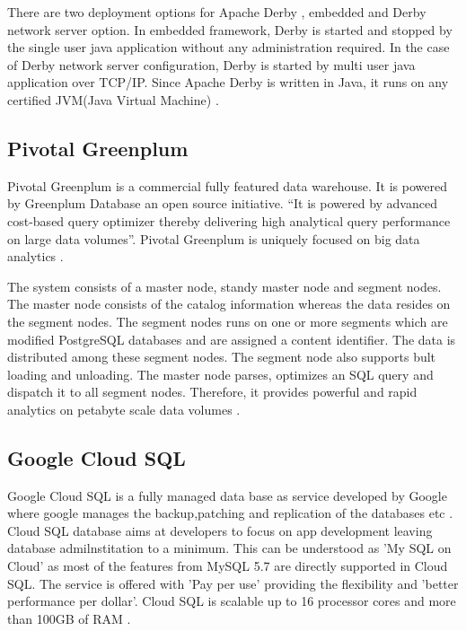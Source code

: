      There are two deployment options for Apache Derby , embedded and
     Derby network server option. In embedded framework, Derby is
     started and stopped by the single user java application without
     any administration required. In the case of Derby network server
     configuration, Derby is started by multi user java application
     over TCP/IP. Since Apache Derby is written in Java, it runs on
     any certified JVM(Java Virtual Machine) \cite{www-derbymanual}.

     \pv
      
\subsection{Pivotal Greenplum}

     Pivotal Greenplum is a commercial fully featured data
     warehouse. It is powered by Greenplum Database an open source
     initiative. ``It is powered by advanced cost-based query optimizer
     thereby delivering high analytical query performance on large
     data volumes''. Pivotal Greenplum is uniquely focused on big data
     analytics \cite{pivotal.io}.

     The system consists of a master node, standy master node and
     segment nodes. The master node consists of the catalog
     information whereas the data resides on the segment nodes.  The
     segment nodes runs on one or more segments which are modified
     PostgreSQL databases and are assigned a content identifier. The
     data is distributed among these segment nodes. The segment node
     also supports bult loading and unloading. The master node parses,
     optimizes an SQL query and dispatch it to all segment
     nodes. Therefore, it provides powerful and rapid analytics on
     petabyte scale data volumes \cite{pivotal_wikipedia}.
     
\subsection{Google Cloud SQL}
     
     Google Cloud SQL is a fully managed data base as service
     developed by Google where google manages the backup,patching and
     replication of the databases etc
     \cite{www-cloud-sql-google}. Cloud SQL database aims at
     developers to focus on app development leaving database
     admilnstitation to a minimum. This can be understood as 'My SQL
     on Cloud' as most of the features from MySQL 5.7 are directly
     supported in Cloud SQL. The service is offered with 'Pay per
     use' providing the flexibility and 'better performance per
     dollar'.  Cloud SQL is scalable up to 16 processor cores and
     more than 100GB of RAM \cite{www-cloud-sql-google-faq}.

